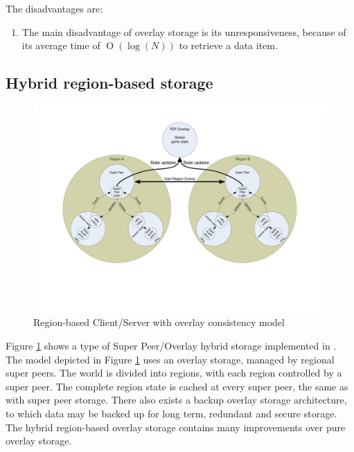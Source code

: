 \documentclass[10pt,a4paper,journal,cspaper,compsoc]{IEEEtran}
\providecommand{\OO}[1]{\operatorname{O}\left(#1\right)}
\begin{document}
The disadvantages are:
%
\begin{enumerate}
    \item The main disadvantage of overlay storage is its unresponsiveness, because of its average time of $\OO{\log(N)}$ to retrieve a data
        item.
\end{enumerate}

\subsection{Hybrid region-based storage}
\label{hybrid_storage}

\begin{figure}[htbp]
 \centering
 \includegraphics[clip=true, viewport=2cm 5cm 27cm 19.5cm, width=\textwidth]{region_based_CS_CM_P2PO}
 \caption{Region-based Client/Server with overlay consistency model}
 \label{fig_cs_region_o_cm}
\end{figure}
%
Figure \ref{fig_cs_region_o_cm} shows a type of Super Peer/Overlay hybrid storage implemented in \cite{zoned_federation}. The model depicted in
Figure \ref{fig_cs_region_o_cm} uses an overlay storage, managed by regional super peers. The world is divided into regions, with each region
controlled by a super peer. The complete region state is cached at every super peer, the same as with super peer storage. There also exists a backup
overlay storage architecture, to which data may be backed up for long term, redundant and secure storage. The hybrid region-based overlay storage
contains many improvements over pure overlay storage.
\end{document}
